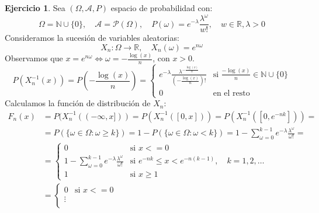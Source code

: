 \documentclass{report}
\theoremstyle{remark}
\theoremstyle{remark}
\theoremstyle{remark}
\theoremstyle{definition}
\theoremstyle{definition}
\theoremstyle{definition}
\theoremstyle{definition}
\newtheorem*{exercise}{Ejercicio}
\begin{document}
\begin{exercise}
    Sea $(\Omega, \mathcal{A}, P)$ espacio de probabilidad con:
    $$\Omega = \mathbb{N} \cup \{0\}, \quad \mathcal{A} = \mathcal{P}(\Omega), \quad P(\omega) = e^{-\lambda} \frac{\lambda^\omega}{w!}, \quad w \in \mathbb{R}, \lambda > 0$$
    Consideramos la sucesión de variables aleatorias:
    $$X_n: \Omega \to \mathbb{R}, \quad X_n(\omega) = e^{n\omega}$$
    Observamos que $x = e^{n\omega} \Leftrightarrow \omega = -\frac{\log(x)}{n}$, con $x > 0$.
    $$P(X_n^{-1}(x)) = P\left(-\frac{\log(x)}{n}\right) = \begin{cases}
            e^{-\lambda} \frac{\lambda^{-\frac{\log(x)}{n}}}{\left(-\frac{\log(x)}{n}\right)!} & \text{si } \frac{-\log(x)}{n} \in \mathbb{N} \cup \{0\} \\
            0                                                                                  & \text{en el resto}
        \end{cases}$$
    Calculamos la función de distribución de $X_n$:
    \begin{align*}
        F_n(x) & = P(X_n^{-1}((-\infty,x])) = P(X_n^{-1}([0,x])) = P(X_n^{-1}([0,e^{-nk}])) =                                                                                        \\
               & = P(\{ \omega \in \Omega : \omega \geq k \}) = 1 - P(\{ \omega \in \Omega : \omega < k \}) = 1 - \sum_{\omega=0}^{k-1} e^{-\lambda}\frac{\lambda^\omega}{\omega!} = \\
               & = \begin{cases}
                       0                                                                    & \text{si } x <= 0                                              \\
                       1 - \sum_{\omega=0}^{k-1} e^{-\lambda}\frac{\lambda^\omega}{\omega!} & \text{si } e^{-nk} \leq x < e^{-n(k-1)}, \quad k = 1, 2, \dots \\
                       1                                                                    & \text{si } x \geq 1
                   \end{cases}                             \\
               & = \begin{cases}
                       0                           & \text{si } x <= 0                  \\
                       \vdots                                                           \\

\end{cases}
\end{align*}
\end{exercise}
\end{document}
